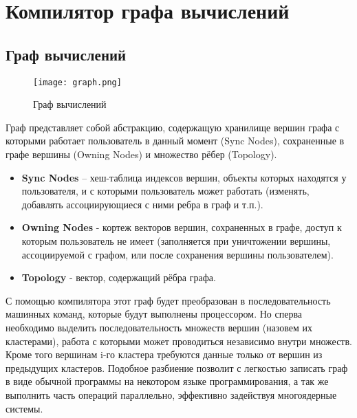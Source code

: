 \clearpage

\section{Компилятор графа вычислений}
\subsection{Граф вычислений}
\label{sec:compgraph}
\begin{figure}[ht]
    \centering
    \texttt{[image: graph.png]}
    \caption{Граф вычислений}
    \label{fig:graphimpl}
\end{figure}
Граф представляет собой абстракцию, содержащую хранилище вершин графа с которыми работает пользователь в данный момент (Sync Nodes), сохраненные в графе вершины (Owning Nodes) и множество рёбер (Topology).
\begin{itemize}
    \item \textbf{Sync Nodes} -- хеш-таблица индексов вершин, объекты которых находятся у пользователя, и с которыми пользователь может работать (изменять, добавлять ассоциирующиеся с ними ребра в граф и т.п.).
    \item \textbf{Owning Nodes} - кортеж векторов вершин, сохраненных в графе, доступ к которым пользователь не имеет (заполняется при уничтожении вершины, ассоциируемой с графом, или после сохранения вершины пользователем).
    \item \textbf{Topology} - вектор, содержащий рёбра графа.
\end{itemize}
С помощью компилятора этот граф будет преобразован в последовательность машинных
команд, которые будут выполнены процессором. Но сперва необходимо выделить последовательность множеств вершин (назовем
их кластерами), работа с которыми может проводиться независимо внутри множеств. Кроме того вершинам i-го кластера требуются
данные только от вершин из предыдущих кластеров. Подобное разбиение позволит
с легкостью записать граф в виде обычной программы на некотором языке программирования,
а так же выполнить часть операций параллельно, эффективно задействуя многоядерные
системы.

